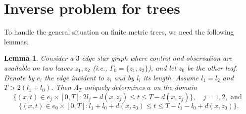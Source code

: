 \documentclass[11pt]{amsart}
\theoremstyle{definition}
\theoremstyle{plain}
\newtheorem{lemma}[definition]{Lemma}
\numberwithin{equation}{section}
\begin{document}
\section{Inverse problem for trees}
\label{sec-general}


To handle the general situation on finite metric trees, we need the following lemmas.


\begin{lemma} \label{star-interfere}
Consider a $3$-edge star graph where control and observation are available on two leaves $z_1,z_2$ (i.e., $\Gamma_0=\{z_1,z_2\}$), and let $z_0$ be the other leaf.
Denote by $e_i$ the edge incident to $z_i$ and by $l_i$ its length.
{Assume $l_1=l_2$ and $T>2(l_1+l_0)$.
Then $\Lambda_T$ uniquely determines $a$ on the domain
$$\big\{(x,t)\in e_j\times [0,T]: 2l_j-d(x,z_j)\leq t\leq T-d(x,z_j)  \big\},\quad j=1,2, \textrm{ and }$$
$$\big\{ (x,t)\in e_0\times [0,T]:  l_1+l_0+d(x,z_0) \leq t \leq T-l_1-l_0+d(x,z_0)\big\}.$$}
\end{lemma}
\end{document}
